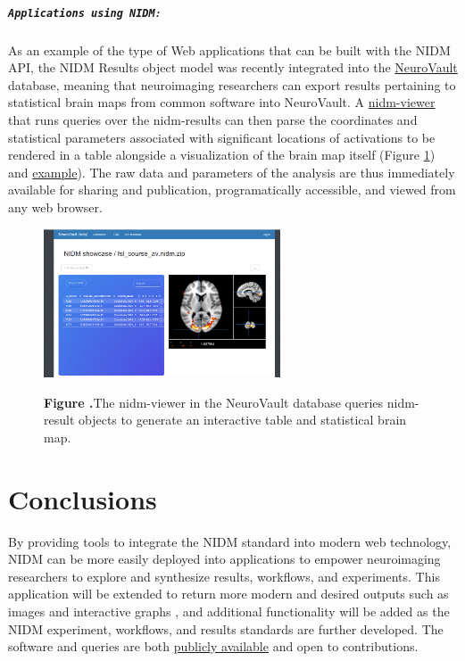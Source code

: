 \documentclass[twocolumn]{bmcart}%
\begin{document}
\subparagraph{\texorpdfstring{\texttt{Applications using NIDM}:}{:}}\label{section}
As an example of the type of Web applications that can be built with the NIDM API, the NIDM Results object model \cite{noauthor_undated-if} was recently integrated into the \href{http://www.neurovault.org}{NeuroVault} database, meaning that neuroimaging researchers can export results pertaining to statistical brain maps from common software \cite{Jenkinson2012-pr} into NeuroVault. A \href{https://github.com/vsoch/nidmviewer}{nidm-viewer} that runs queries over the nidm-results can then parse the coordinates and statistical parameters associated with significant locations of activations to be rendered in a table alongside a visualization of the brain map itself (Figure \ref{fig:02}) and \href{http://neurovault.org/collections/877/fsl_course_av.nidm}{example}). The raw data and parameters of the analysis are thus immediately available for sharing and publication, programatically accessible, and viewed from any web browser. 

\begin{figure}[h!]
\begin{center}
\includegraphics[width=7cm]{img/figure2}
\end{center}
 \textbf{\label{fig:02}Figure .}{The nidm-viewer in the NeuroVault database queries nidm-result objects to generate an interactive table and statistical brain map.}
\end{figure}

\section{Conclusions}\label{conclusions}

By providing tools to integrate the NIDM standard into modern web technology, NIDM can be more easily deployed into applications to empower neuroimaging researchers to explore and synthesize results, workflows, and experiments. This application will be extended to return more modern and desired outputs such as images and interactive graphs \cite{noauthor_undated-fs}, and additional functionality will be added as the NIDM experiment, workflows, and results standards are further developed. The software and queries are both \href{https://github.com/incf-nidash}{publicly available} and open to contributions.
\end{document}
